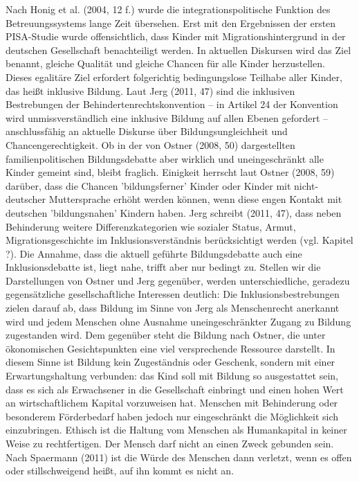 Nach Honig et al. (2004, 12 f.) wurde die integrationspolitische Funktion des Betreuungssystems lange Zeit übersehen. Erst mit den Ergebnissen der ersten PISA-Studie wurde offensichtlich, dass Kinder mit Migrationshintergrund in der deutschen Gesellschaft benachteiligt werden. In aktuellen Diskursen wird das Ziel benannt, gleiche Qualität und gleiche Chancen für alle Kinder herzustellen. Dieses egalitäre Ziel erfordert folgerichtig bedingungslose Teilhabe aller Kinder, das heißt inklusive Bildung. Laut Jerg (2011, 47) sind die inklusiven Bestrebungen der Behindertenrechtskonvention – in Artikel 24 der Konvention wird unmissverständlich eine inklusive Bildung auf allen Ebenen gefordert – anschlussfähig an aktuelle Diskurse über Bildungsungleichheit und Chancengerechtigkeit. Ob in der von Ostner (2008, 50) dargestellten familienpolitischen Bildungsdebatte aber wirklich und uneingeschränkt alle Kinder gemeint sind, bleibt fraglich. Einigkeit herrscht laut Ostner (2008, 59) darüber, dass die Chancen 'bildungsferner' Kinder oder Kinder mit nicht-deutscher Muttersprache erhöht werden können, wenn diese engen Kontakt mit deutschen 'bildungsnahen' Kindern haben. Jerg schreibt (2011, 47), dass neben Behinderung weitere Differenzkategorien wie sozialer Status, Armut, Migrationsgeschichte im Inklusionsverständnis berücksichtigt werden (vgl. Kapitel ?). Die Annahme, dass die aktuell geführte Bildungsdebatte auch eine Inklusionsdebatte ist, liegt nahe, trifft aber nur bedingt zu. Stellen wir die Darstellungen von Ostner und Jerg gegenüber, werden unterschiedliche, geradezu gegensätzliche gesellschaftliche Interessen deutlich: Die Inklusionsbestrebungen zielen darauf ab, dass Bildung im Sinne von Jerg als Menschenrecht anerkannt wird und jedem Menschen ohne Ausnahme uneingeschränkter Zugang zu Bildung zugestanden wird. Dem gegenüber steht die Bildung nach Ostner, die unter ökonomischen Gesichtspunkten eine viel versprechende Ressource darstellt. In diesem Sinne ist Bildung kein Zugeständnis oder Geschenk, sondern mit einer Erwartungshaltung verbunden: das Kind soll mit Bildung so ausgestattet sein, dass es sich als Erwachsener in die Gesellschaft einbringt und einen hohen Wert an wirtschaftlichem Kapital vorzuweisen hat. Menschen mit Behinderung oder besonderem Förderbedarf haben jedoch nur eingeschränkt die Möglichkeit sich einzubringen. Ethisch ist die Haltung vom Menschen als Humankapital in keiner Weise zu rechtfertigen. Der Mensch darf nicht an einen Zweck gebunden sein. Nach Spaermann (2011) ist die Würde des Menschen dann verletzt, wenn es offen oder stillschweigend heißt, auf ihn kommt es nicht an. 

